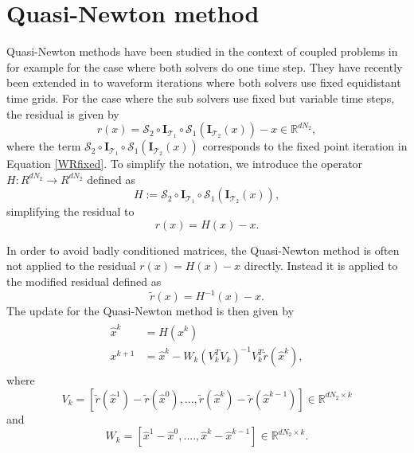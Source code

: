 \section{Quasi-Newton method}

Quasi-Newton methods have been studied in the context of coupled problems in for example \cite{HaDe10,SchMe17,SchUe15} for the case where both solvers do one time step. They have recently been extended in \cite{RuUe21} to waveform iterations where both solvers use fixed equidistant time grids. For the case where the sub solvers use fixed but variable time steps, the residual is given by
\begin{equation}
	r(x) = \mathcal{S}_{2}  \circ \mathbf{I}_{\mathcal{T}_1} \circ \mathcal{S}_{1}( \mathbf{I}_{\mathcal{T}_2}(x)) - x \in \mathbb{R}^{d N_2},
\end{equation} 
where the term $\mathcal{S}_{2}  \circ \mathbf{I}_{\mathcal{T}_1} \circ \mathcal{S}_{1}( \mathbf{I}_{\mathcal{T}_2}(x))$ corresponds to the fixed point iteration in Equation \eqref{WRfixed}. 
To simplify the notation, we introduce the operator $H:R^{dN_2} \xrightarrow{} R^{d N_2}$ defined as 
\begin{equation*}
	H :=\mathcal{S}_{2}  \circ \mathbf{I}_{\mathcal{T}_1} \circ \mathcal{S}_{1}( \mathbf{I}_{\mathcal{T}_2}(x)), 
\end{equation*} 
simplifying the residual to 
\begin{equation*}
	r(x) = H(x) - x.
\end{equation*}

In order to avoid badly conditioned matrices, the Quasi-Newton method is often not applied to the residual $r(x) = H(x) - x$ directly. Instead it is applied to the modified residual defined as 
\begin{equation*}
	\tilde{r}(x) = H^{-1}(x) - x.
\end{equation*}
The update for the Quasi-Newton method is then given by
\begin{align}\label{QNWRFixed}
	\begin{split}
		\hat{x}^k &= H(x^k) \\
		x^{k+1} &= \hat{x}^{k} - W_k (V_k^T V_k)^{-1}V_k^{T} \tilde{r}(\hat{x}^{k}),
	\end{split}
\end{align} 
where  
\begin{equation*}
	V_k = [\tilde{r}(\hat{x}^1)-\tilde{r}(\hat{x}^0), ... , \tilde{r}(\hat{x}^k)-\tilde{r}(\hat{x}^{k-1})]  \in \mathbb{R}^{dN_2  \times k}
\end{equation*} 
and 
\begin{equation*}
	W_k = [\hat{x}^1 -\hat{x}^0, .... , \hat{x}^{k}- \hat{x}^{k-1}] \in \mathbb{R}^{dN_2 \times k}.
\end{equation*}

